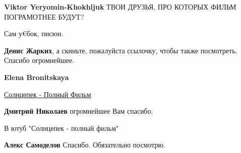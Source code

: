 \begin{itemize}
\begin{itemize}
\textbf{Viktor Yeryomin-Khokhljuk} ТВОИ ДРУЗЬЯ, ПРО КОТОРЫХ ФИЛЬМ ПОГРАМОТНЕЕ БУДУТ?

 
Сам у€бок, писюн.

\end{itemize}

 
\textbf{Денис Жарких}, а скиньте, пожалуйста ссылочку, чтобы также посмотреть.
Спасибо огромнейшее.

\begin{itemize}
 
\textbf{Elena Bronitskaya} 

\href{https://www.youtube.com/watch?v=YfpHRZcaMms}{%
Солнцепек - Полный Фильм%
}

 
\textbf{Дмитрий Николаев} огромнейшее Вам спасибо.

 
В ютуб "Солнцепек - полный фильм"

 
\textbf{Алекс Самоделов} Спасибо. Обязательно посмотрю.

 

\end{itemize}
\end{itemize}

